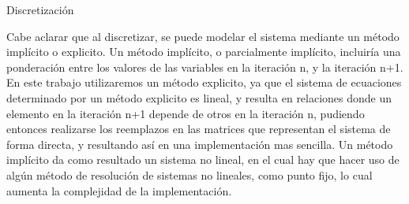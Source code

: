 \begin{section}{Discretización}
\begin{minipage}{\linewidth}
Cabe aclarar que al discretizar, se puede modelar el sistema mediante un método implícito o explicito. Un método implícito, o parcialmente implícito, incluiría una ponderación entre los valores de las variables en la iteración n, y la iteración n+1. En este trabajo utilizaremos un método explicito, ya que el sistema de ecuaciones determinado por un método explicito es lineal, y resulta en relaciones donde un elemento en la iteración n+1 depende de otros en la iteración n, pudiendo entonces realizarse los reemplazos en las matrices que representan el sistema de forma directa, y resultando así en una implementación mas sencilla. Un método implícito da como resultado un sistema no lineal, en el cual hay que hacer uso de algún método de resolución de sistemas no lineales, como punto fijo, lo cual aumenta la complejidad de la implementación.

\end{minipage}
\end{section}